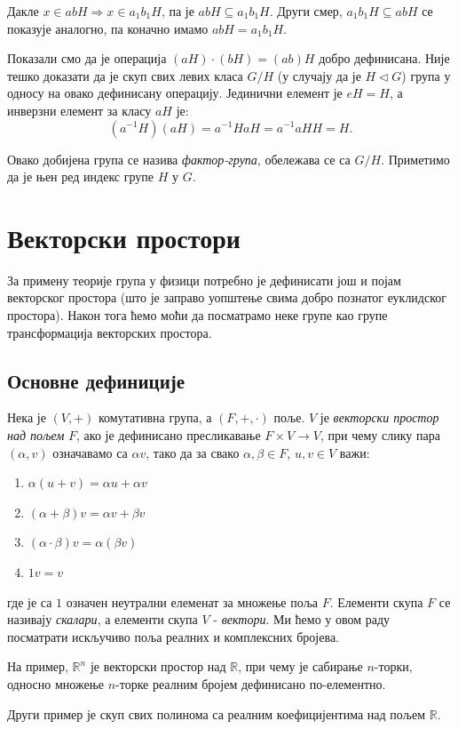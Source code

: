 \documentclass{report}
\theoremstyle{plain}
\theoremstyle{definition}
\begin{document}
Дакле $x\in abH \Rightarrow x\in a_1b_1H$, па  је $abH \subseteq a_1b_1H$. Други смер, $a_1 b_1 H \subseteq abH$ се показује аналогно, па коначно имамо $abH = a_1b_1H$.

Показали смо да је операција $(aH)\cdot (bH) = (ab)H$ добро дефинисана. Није тешко доказати да је скуп свих левих класа $G/H$ (у случају да је $H\lhd G$) група у односу на овако дефинисану операцију. Јединични елемент је $eH = H$, а инверзни елемент за класу $aH$ је:
$$(a^{-1}H)(aH) = a^{-1}HaH = a^{-1}aHH = H.$$

Овако добијена група се назива \emph{фактор-група}, обележава се са $G/H$. Приметимо да је њен ред индекс групе $H$ у $G$.

\chapter{Векторски простори}
За примену теорије група у физици потребно је дефинисати још и појам векторског простора (што је заправо уопштење свима добро познатог еуклидског простора). Након тога ћемо моћи да посматрамо неке групе као групе трансформација векторских простора.
\section{Основне дефиниције}
Нека је $(V, +)$ комутативна група, а $(F, +, \cdot)$ поље. $V$ је \emph{векторски простор над пољем} $F$, ако је дефинисано пресликавање $F\times V\to V$, при чему слику пара $(\alpha, v)$ означавамо са $\alpha v$, тако да за свако $\alpha, \beta \in F$, $u, v\in V$ важи:
\begin{enumerate}
\item $\alpha(u+v) = \alpha u+\alpha v$
\item $(\alpha + \beta)v = \alpha v+ \beta v$
\item $(\alpha\cdot\beta)v = \alpha(\beta v)$
\item $1v = v$
\end{enumerate}
где је са $1$ означен неутрални елеменат за множење поља $F$. Елементи скупа $F$ се називају \emph{скалари}, а елементи скупа $V$ - \emph{вектори}. Ми ћемо у овом раду посматрати искључиво поља реалних и комплексних бројева.

На пример, $\mathbb{R}^n$ је векторски простор над $\mathbb{R}$, при чему је сабирање $n$-торки, односно множење $n$-торке реалним бројем дефинисано по-елементно.

Други пример је скуп свих полинома са реалним коефицијентима над пољем $\mathbb{R}$.
\end{document}
